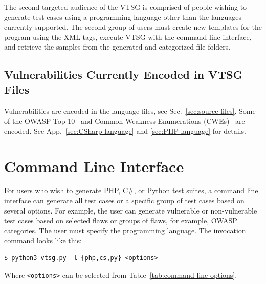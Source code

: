 \documentclass[12pt]{article}
\newcommand{\CSharp}{C{\fontseries{b}\selectfont\#}}
\begin{document}
The second targeted audience of the VTSG is comprised of people wishing to generate
test cases using a programming language other than the languages currently
supported.  The second group of users must create new templates for the program
using the XML tags, execute VTSG with the command line interface,
and retrieve the samples from the generated and categorized file folders.

\subsection{Vulnerabilities Currently Encoded in VTSG Files}

Vulnerabilities are encoded in the language files, see Sec.~\ref{sec:source files}.
Some of the OWASP Top 10~\cite{OWASPTop10-2017} and
Common Weakness Enumerations (CWEs)~\cite{CWE} are encoded.
See App.~\ref{sec:CSharp language} and \ref{sec:PHP language} for details.


\section{Command Line Interface}
\label{sec:command line interface}

For users who wish to generate PHP, \CSharp, or Python test suites, a command line
interface
can generate all test cases or a specific group of test cases based on several
options.  For example, the user can generate vulnerable or non-vulnerable test cases
based on selected flaws or groups of flaws, for example, OWASP categories.
The user must specify the
programming language.  The invocation command looks like this:
\begin{verbatim}
$ python3 vtsg.py -l {php,cs,py} <options>
\end{verbatim}

\newcommand{\texlangle}{$\langle$}
\newcommand{\texrangle}{$\rangle$}
Where \verb|<options>| can be selected from
Table~\ref{tab:command line options}.
\end{document}
